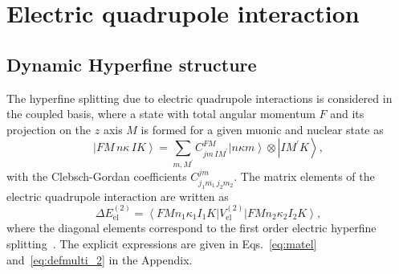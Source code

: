 \section{Electric quadrupole interaction}
\subsection{Dynamic Hyperfine structure}
The hyperfine splitting due to electric quadrupole interactions is considered in the coupled basis, where a state with total angular momentum $F$ and its projection on the $z$  axis $M$ is formed for a given muonic and nuclear state as
\begin{equation}
\left| FM\,n\kappa\,IK \right> = \sum_{m,M^\prime} C^{FM}_{jm\,IM^\prime} \left|n\kappa m\right>\otimes\left|IM^\prime K\right>,
\end{equation}
with the Clebsch-Gordan coefficients $C^{jm}_{j_1m_1\,j_2m_2}$. The matrix elements of the electric quadrupole interaction are written as
\begin{equation}
\Delta E^{(2)}_{\text{el}} = \left< FMn_1\kappa_1I_1K\right|{V_{\text{el}}^{(2)}}\left|FMn_2\kappa_2I_2K\right>,
\label{eq:quadel}
\end{equation}
where the diagonal elements correspond to the first order electric hyperfine splitting~\cite{michel2017}. The explicit expressions are given in Eqs.~\eqref{eq:matel} and~\eqref{eq:defmulti_2} in the Appendix.
